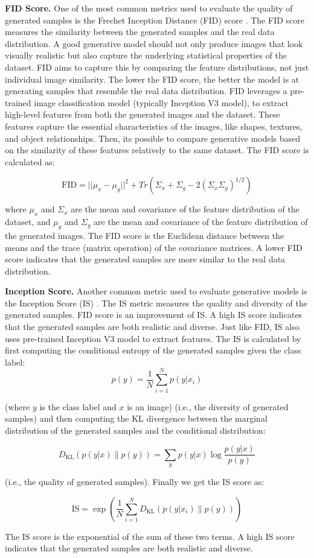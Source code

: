 \textbf{FID Score.} One of the most common metrics used to evaluate the quality of generated samples is the Frechet Inception Distance (FID) score \cite{fid_score}. The FID score measures the similarity between the generated samples and the real data distribution. A good generative model should not only produce images that look visually realistic but also capture the underlying statistical properties of the dataset. FID aims to capture this by comparing the feature distributions, not just individual image similarity. The lower the FID score, the better the model is at generating samples that resemble the real data distribution. FID leverages a pre-trained image classification model (typically Inception V3 model), to extract high-level features from both the generated images and the dataset. These features capture the essential characteristics of the images, like shapes, textures, and object relationships. Then, its possible to compare generative models based on the similarity of these features relatively to the same dataset. The FID score is calculated as:

\begin{equation}
    \text{FID} = ||\mu_x - \mu_g||^2 + Tr(\Sigma_x + \Sigma_g - 2(\Sigma_x\Sigma_g)^{1/2})
    \label{eq:fid_score}
\end{equation}

where $\mu_x$ and $\Sigma_x$ are the mean and covariance of the feature distribution of the dataset, and $\mu_g$ and $\Sigma_g$ are the mean and covariance of the feature distribution of the generated images. The FID score is the Euclidean distance between the means and the trace (matrix operation) of the covariance matrices. A lower FID score indicates that the generated samples are more similar to the real data distribution.

\textbf{Inception Score.} Another common metric used to evaluate generative models is the Inception Score (IS) \cite{is_score}. The IS metric measures the quality and diversity of the generated samples. FID score is an improvement of IS. A high IS score indicates that the generated samples are both realistic and diverse. Just like FID, IS also uses pre-trained Inception V3 model to extract features. The IS is calculated by first computing the conditional entropy of the generated samples given the class label: 
\[
    p(y) = \frac{1}{N} \sum_{i=1}^{N} p(y|x_i)
\] 

(where $y$ is the class label and $x$ is an image) (i.e., the diversity of generated samples) and then computing the KL divergence between the marginal distribution of the generated samples and the conditional distribution:

\[
    D_{\text{KL}}(p(y|x) \| p(y)) = \sum_{y} p(y|x) \log \frac{p(y|x)}{p(y)}
\]

(i.e., the quality of generated samples). Finally we get the IS score as:

\[
    \text{IS} = \exp \left( \frac{1}{N} \sum_{i=1}^{N} D_{\text{KL}}(p(y|x_i) \| p(y)) \right)
\]

The IS score is the exponential of the sum of these two terms. A high IS score indicates that the generated samples are both realistic and diverse.